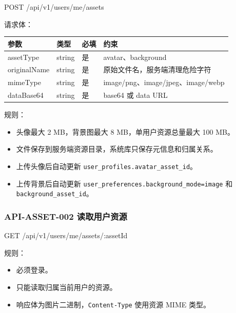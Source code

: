 \documentclass[
  a4paper,
  UTF8]{ctexart}
\newenvironment{Shaded}{}{}
\newcommand{\NormalTok}[1]{#1}
\providecommand{\tightlist}{%
  \setlength{\itemsep}{0pt}\setlength{\parskip}{0pt}}
\begin{document}
\begin{Shaded}
\begin{Highlighting}[]
\NormalTok{POST /api/v1/users/me/assets}
\end{Highlighting}
\end{Shaded}

请求体：

\begin{longtable}[]{@{}llll@{}}
\toprule
参数 & 类型 & 必填 & 约束 \\
\midrule
\endhead
assetType & string & 是 & avatar、background \\
originalName & string & 是 & 原始文件名，服务端清理危险字符 \\
mimeType & string & 是 & image/png、image/jpeg、image/webp \\
dataBase64 & string & 是 & base64 或 data URL \\
\bottomrule
\end{longtable}

规则：

\begin{itemize}
\tightlist
\item
  头像最大 2 MB，背景图最大 8 MB，单用户资源总量最大 100 MB。
\item
  文件保存到服务端资源目录，系统库只保存元信息和归属关系。
\item
  上传头像后自动更新 \texttt{user\_profiles.avatar\_asset\_id}。
\item
  上传背景后自动更新 \texttt{user\_preferences.background\_mode=image}
  和 \texttt{background\_asset\_id}。
\end{itemize}

\hypertarget{api-asset-002-ux8bfbux53d6ux7528ux6237ux8d44ux6e90}{%
\subsubsection{API-ASSET-002
读取用户资源}\label{api-asset-002-ux8bfbux53d6ux7528ux6237ux8d44ux6e90}}

\begin{Shaded}
\begin{Highlighting}[]
\NormalTok{GET /api/v1/users/me/assets/:assetId}
\end{Highlighting}
\end{Shaded}

规则：

\begin{itemize}
\tightlist
\item
  必须登录。
\item
  只能读取归属当前用户的资源。
\item
  响应体为图片二进制，\texttt{Content-Type} 使用资源 MIME 类型。
\end{itemize}
\end{document}
